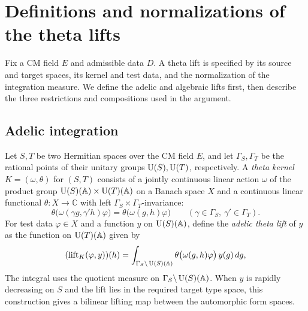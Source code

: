 \section{Definitions and normalizations of the theta lifts}
\label{sec:theta-lifts}

Fix a CM field $E$ and admissible data $D$. A theta lift is specified by its source and target spaces, its kernel and test data, and the normalization of the integration measure. We define the adelic and algebraic lifts first, then describe the three restrictions and compositions used in the argument.

\subsection{Adelic integration}

\begin{definition}
\label{def:adelic-theta-lift}
\emitthmsource
Let $S,T$ be two Hermitian spaces over the CM field $E$, and let $\Gamma_S,\Gamma_T$ be the rational points of their unitary groups $\operatorname{U}(S),\operatorname{U}(T)$, respectively.
A \emph{theta kernel} $K=(\omega,\theta)$ for $(S,T)$ consists of a jointly continuous linear action $\omega$ of the product group $\operatorname{U}(S)(\mathbb A)\times \operatorname{U}(T)(\mathbb A)$ on a Banach space $X$ and a continuous linear functional $\theta\colon X\to\mathbb C$ with left $\Gamma_S\times\Gamma_T$-invariance:
\[
 \theta\bigl(\omega(\gamma g,\gamma' h)\varphi\bigr)=\theta\bigl(\omega(g,h)\varphi\bigr)
 \qquad (\gamma\in\Gamma_S,\ \gamma'\in\Gamma_T).
\]
For test data $\varphi\in X$ and a function $y$ on $\operatorname{U}(S)(\mathbb A)$, define the \emph{adelic theta lift} of $y$ as the function on $\operatorname{U}(T)(\mathbb A)$ given by
\begin{equation}
 (\operatorname{lift}_K(\varphi,y))(h)
 =\int_{\Gamma_S\backslash \operatorname{U}(S)(\mathbb A)}
   \theta\bigl(\omega(g,h)\varphi\bigr)\,y(g)\,dg ,
\label{eq:adelic-theta-integral}
\end{equation}
The integral uses the quotient measure on $\Gamma_S\backslash \operatorname{U}(S)(\mathbb A)$. When $y$ is rapidly decreasing on $S$ and the lift lies in the required target type space, this construction gives a bilinear lifting map between the automorphic form spaces.
\end{definition}

